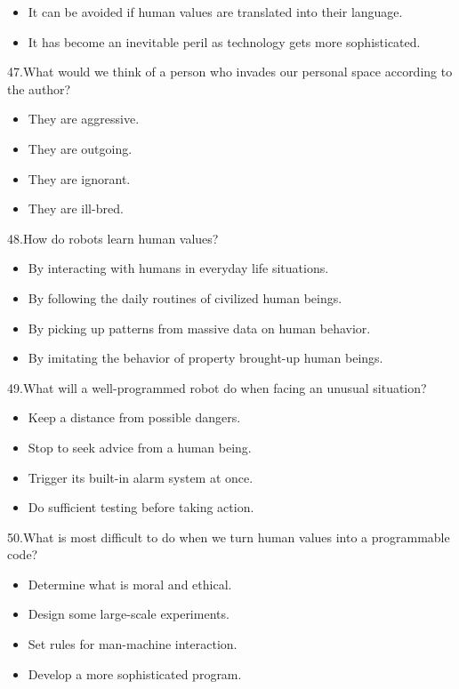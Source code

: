 \documentclass[UTF8,11pt]{ctexart}
\begin{document}
\begin{itemize}[leftmargin=2em,itemsep=.2em,topsep=.4em]\item[C.] It can be avoided if human values are translated into their language.
\item[D.] It has become an inevitable peril as technology gets more sophisticated.
\end{itemize}

47.What would we think of a person who invades our personal space according to the author?


\begin{itemize}[leftmargin=2em,itemsep=.2em,topsep=.4em]\item[A.] They are aggressive.
\item[B.] They are outgoing.
\item[C.] They are ignorant.
\item[D.] They are ill-bred.
\end{itemize}

48.How do robots learn human values?


\begin{itemize}[leftmargin=2em,itemsep=.2em,topsep=.4em]\item[A.] By interacting with humans in everyday life situations.
\item[B.] By following the daily routines of civilized human beings.
\item[C.] By picking up patterns from massive data on human behavior.
\item[D.] By imitating the behavior of property brought-up human beings.
\end{itemize}

49.What will a well-programmed robot do when facing an unusual situation?


\begin{itemize}[leftmargin=2em,itemsep=.2em,topsep=.4em]\item[A.] Keep a distance from possible dangers.
\item[B.] Stop to seek advice from a human being.
\item[C.] Trigger its built-in alarm system at once.
\item[D.] Do sufficient testing before taking action.
\end{itemize}

50.What is most difficult to do when we turn human values into a programmable code?


\begin{itemize}[leftmargin=2em,itemsep=.2em,topsep=.4em]\item[A.] Determine what is moral and ethical.
\item[B.] Design some large-scale experiments.
\item[C.] Set rules for man-machine interaction.
\item[D.] Develop a more sophisticated program.
\end{itemize}
\end{document}
